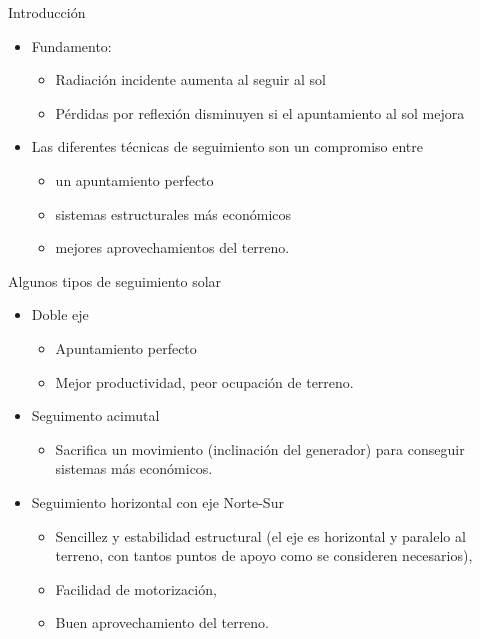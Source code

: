 \documentclass[xcolor={usenames,svgnames,dvipsnames}]{beamer}
\begin{document}
\begin{frame}[label={sec:orgee12233}]{Introducción}
\begin{itemize}[<+->]
\item \alert{Fundamento:}
\begin{itemize}[<.->]
\item Radiación incidente aumenta al seguir al sol

\item Pérdidas por reflexión disminuyen si el apuntamiento al sol mejora
\end{itemize}

\item Las diferentes técnicas de seguimiento son un \alert{compromiso} entre
\begin{itemize}[<.->]
\item un \alert{apuntamiento perfecto}

\item \alert{sistemas estructurales más económicos}

\item mejores \alert{aprovechamientos del terreno}.
\end{itemize}
\end{itemize}
\end{frame}
\begin{frame}[label={sec:orga7ad622}]{Algunos tipos de seguimiento solar}
\begin{itemize}[<+->]
\item \alert{Doble eje}
\begin{itemize}[<.->]
\item Apuntamiento \guillemotleft{}perfecto\guillemotright{}

\item Mejor productividad, peor ocupación de terreno.
\end{itemize}

\item \alert{Seguimento acimutal}
\begin{itemize}[<.->]
\item Sacrifica un movimiento (inclinación del generador) para conseguir
sistemas más económicos.
\end{itemize}

\item \alert{Seguimiento horizontal con eje Norte-Sur}
\begin{itemize}[<.->]
\item Sencillez y estabilidad estructural (el eje es horizontal y
paralelo al terreno, con tantos puntos de apoyo como se consideren
necesarios),

\item Facilidad de motorización,

\item Buen aprovechamiento del terreno.
\end{itemize}
\end{itemize}
\end{frame}
\end{document}

